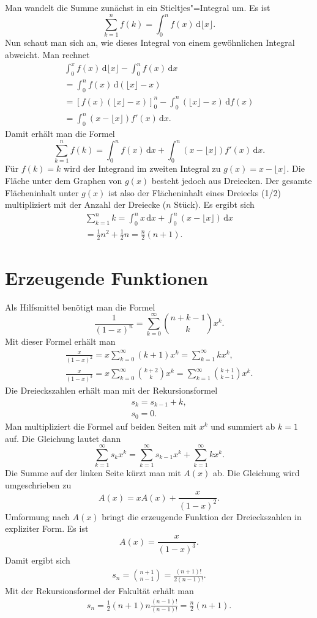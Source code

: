 \documentclass[a4paper,10pt,fleqn,twocolumn,twoside]{article}
\begin{document}
Man wandelt die Summe zunächst in ein Stieltjes"=Integral um. Es ist
\[\sum_{k=1}^n f(k) = \int_0^n f(x)\,\mathrm d\lfloor x\rfloor.\]
Nun schaut man sich an, wie dieses Integral von einem gewöhnlichen
Integral abweicht. Man rechnet
\begin{gather*}
\int_0^x f(x)\,\mathrm d\lfloor x\rfloor - \int_0^n f(x)\,\mathrm dx\\
= \int_0^n f(x)\,\mathrm d(\lfloor x\rfloor-x)\\
= [f(x)(\lfloor x\rfloor-x)]_0^n
- \int_0^n (\lfloor x\rfloor -x)\,\mathrm df(x)\\
= \int_0^n (x-\lfloor x\rfloor)f'(x)\,\mathrm dx.
\end{gather*}
Damit erhält man die Formel
\[\sum_{k=1}^n f(k) = \int_0^n f(x)\,\mathrm dx
+\int_0^n (x-\lfloor x\rfloor)f'(x)\,\mathrm dx.\]
Für \(f(k)=k\) wird der Integrand im zweiten Integral zu
\(g(x)=x-\lfloor x\rfloor\). Die Fläche unter dem Graphen von \(g(x)\)
besteht jedoch aus Dreiecken. Der gesamte Flächeninhalt unter \(g(x)\)
ist also der Flächeninhalt eines Dreiecks (1/2) multipliziert
mit der Anzahl der Dreiecke (\(n\) Stück). Es ergibt sich
\begin{gather*}
\sum_{k=1}^n k = \int_0^n x\,\mathrm dx
+\int_0^n (x-\lfloor x\rfloor)\,\mathrm dx\\
= \frac{1}{2}n^2 + \frac{1}{2}n = \frac{n}{2}(n+1).
\end{gather*}

\section{Erzeugende Funktionen}

Als Hilfsmittel benötigt man die Formel
\[\frac{1}{(1-x)^n} = \sum_{k=0}^{\infty} \binom{n+k-1}{k} x^k.\]
Mit dieser Formel erhält man
\begin{gather*}
\frac{x}{(1-x)^2} = x\sum_{k=0}^{\infty} (k+1)x^k
= \sum_{k=1}^{\infty} kx^k,\\
\frac{x}{(1-x)^3} = x\sum_{k=0}^{\infty} \binom{k+2}{k} x^k
= \sum_{k=1}^{\infty} \binom{k+1}{k-1}x^k.
\end{gather*}
Die Dreieckszahlen erhält man mit der Rekursionsformel
\begin{gather*}
s_k=s_{k-1}+k,\\
s_0=0.
\end{gather*}
Man multipliziert die Formel auf beiden Seiten mit \(x^k\)
und summiert ab \(k=1\) auf. Die Gleichung lautet dann
\[\sum_{k=1}^{\infty} s_k x^k
= \sum_{k=1}^{\infty} s_{k-1}x^k + \sum_{k=1}^{\infty} kx^k.\]
Die Summe auf der linken Seite kürzt man mit \(A(x)\) ab.
Die Gleichung wird umgeschrieben zu
\[A(x) = xA(x) + \frac{x}{(1-x)^2}.\]
Umformung nach \(A(x)\) bringt die erzeugende Funktion der
Dreieckszahlen in expliziter Form. Es ist
\[A(x) = \frac{x}{(1-x)^3}.\]
Damit ergibt sich
\begin{gather*}
s_n = \binom{n+1}{n-1} = \frac{(n+1)!}{2(n-1)!}.
\end{gather*}
Mit der Rekursionsformel der Fakultät erhält man
\begin{gather*}
s_n = \frac{1}{2}(n+1)n\frac{(n-1)!}{(n-1)!}
= \frac{n}{2}(n+1).
\end{gather*}
\end{document}
